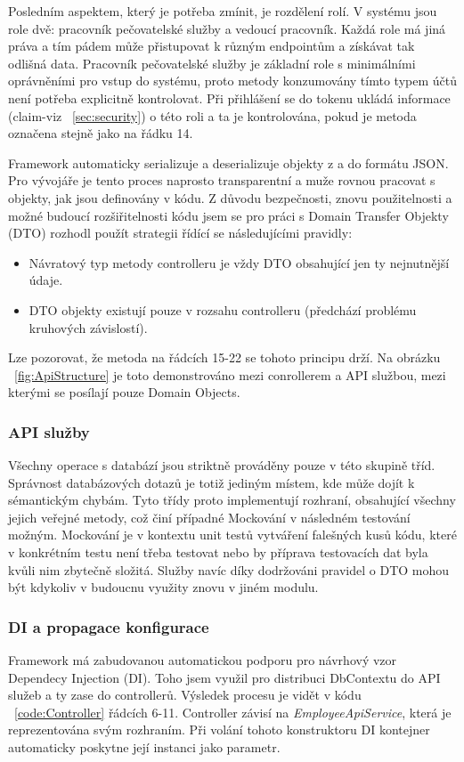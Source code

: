\documentclass[
  glossaries,
]{kidiplom}
\begin{document}
Posledním aspektem, který je potřeba zmínit, je rozdělení rolí. V systému jsou role dvě: pracovník pečovatelské služby a vedoucí pracovník. Každá role má jiná práva a tím pádem může přistupovat k různým endpointům a získávat tak odlišná data. Pracovník pečovatelské služby je základní role s minimálními oprávněními pro vstup do systému, proto metody konzumovány tímto typem účtů není potřeba explicitně kontrolovat. Při přihlášení se do tokenu ukládá informace (claim-viz ~\ref{sec:security}) o této roli a ta je kontrolována, pokud je metoda označena stejně jako na řádku 14.

Framework automaticky serializuje a deserializuje objekty z a do formátu JSON. Pro vývojáře je tento proces naprosto transparentní a muže rovnou pracovat s objekty, jak jsou definovány v kódu. Z důvodu bezpečnosti, znovu použitelnosti a možné budoucí rozšiřitelnosti kódu jsem se pro práci s Domain Transfer Objekty (DTO) rozhodl použít strategii řídící se následujícími pravidly: 
\begin{itemize}
	\item Návratový typ metody controlleru je vždy DTO obsahující jen ty nejnutnější údaje.
	\item DTO objekty existují pouze v rozsahu controlleru (předchází problému kruhových závislostí).
\end{itemize} 
Lze pozorovat, že metoda na řádcích 15-22 se tohoto principu drží. Na obrázku ~\ref{fig:ApiStructure} je toto demonstrováno mezi conrollerem a API službou, mezi kterými se posílají pouze Domain Objects.

\subsubsection{API služby}
Všechny operace s databází jsou striktně prováděny pouze v této skupině tříd. Správnost databázových dotazů je totiž jediným místem, kde může dojít k sémantickým chybám. Tyto třídy proto implementují rozhraní, obsahující všechny jejich veřejné metody, což činí případné Mockování v následném testování možným. Mockování je v kontextu unit testů vytváření falešných kusů kódu, které v konkrétním testu není třeba testovat nebo by příprava testovacích dat byla kvůli nim zbytečně složitá. Služby navíc díky dodržováni pravidel o DTO mohou být kdykoliv v budoucnu využity znovu v jiném modulu. 

\subsubsection{DI a propagace konfigurace}
Framework má zabudovanou automatickou podporu pro návrhový vzor Dependecy Injection (DI). Toho jsem využil pro distribuci DbContextu do API služeb a ty zase do controllerů. Výsledek procesu je vidět v kódu ~\ref{code:Controller} řádcích 6-11. Controller závisí na \textit{EmployeeApiService}, která je reprezentována svým rozhraním.  Při volání tohoto konstruktoru DI kontejner automaticky poskytne její instanci jako parametr.
\end{document}
